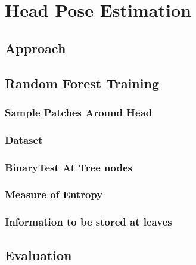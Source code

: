 \chapter{Head Pose Estimation}
\label{sec:HPestimation}

\section{Approach}
\label{sec:HPapproach}

\section{Random Forest Training}
\label{sec:RFtraining}

\subsection{Sample Patches Around Head}
\label{sec:Aroundhead}

\subsection{Dataset}
\label{subsec:HPdataset}

\subsection{BinaryTest At Tree nodes}
\label{subsec:binarytest}

\subsection{Measure of Entropy}
\label{subsec:measureofentropy}

\subsection{Information to be stored at leaves}
\label{subsec:leafdistribution}


\section{Evaluation}
\label{sec:HPevaluation}

